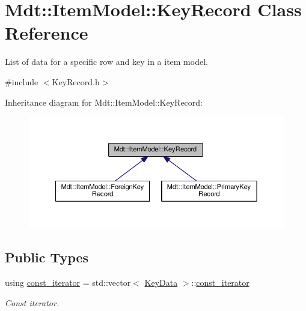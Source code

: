 \hypertarget{class_mdt_1_1_item_model_1_1_key_record}{}\section{Mdt\+:\+:Item\+Model\+:\+:Key\+Record Class Reference}
\label{class_mdt_1_1_item_model_1_1_key_record}


List of data for a specific row and key in a item model.  




{\ttfamily \#include $<$Key\+Record.\+h$>$}



Inheritance diagram for Mdt\+:\+:Item\+Model\+:\+:Key\+Record\+:
\nopagebreak
\begin{figure}[H]
\begin{center}
\leavevmode
\includegraphics[width=350pt]{class_mdt_1_1_item_model_1_1_key_record__inherit__graph}
\end{center}
\end{figure}
\subsection*{Public Types}
\begin{DoxyCompactItemize}
\item 
using \hyperlink{class_mdt_1_1_item_model_1_1_key_record_af1d11bf9db822ef3c493c9ad89677289}{const\+\_\+iterator} = std\+::vector$<$ \hyperlink{class_mdt_1_1_item_model_1_1_key_data}{Key\+Data} $>$\+::\hyperlink{class_mdt_1_1_item_model_1_1_key_record_af1d11bf9db822ef3c493c9ad89677289}{const\+\_\+iterator}\hypertarget{class_mdt_1_1_item_model_1_1_key_record_af1d11bf9db822ef3c493c9ad89677289}{}\label{class_mdt_1_1_item_model_1_1_key_record_af1d11bf9db822ef3c493c9ad89677289}

\begin{DoxyCompactList}\small\item\em Const iterator. \end{DoxyCompactList}\end{DoxyCompactItemize}
